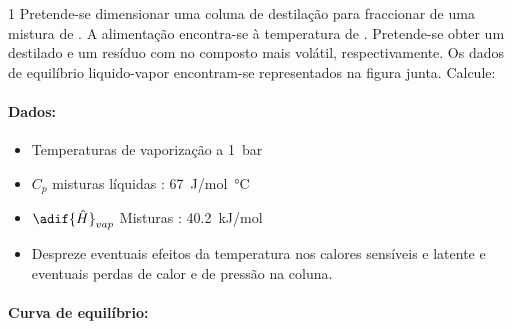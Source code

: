 \documentclass[\mainfilename]{subfiles}
\begin{document}
\begin{questionBox}1{ %
    Pretende-se dimensionar uma coluna de destilação para fraccionar  de uma mistura de . A alimentação encontra-se à temperatura de . Pretende-se obter um destilado e um resíduo com  no composto mais volátil, respectivamente. Os dados de equilíbrio liquido-vapor encontram-se representados na figura junta. Calcule:
} %
    \paragraph*{Dados:}
    \begin{itemize}
        \item Temperaturas de vaporização a \qty*{1}{\bar}
        \begin{itemize}\vspace{-2ex}
        \end{itemize}
        \item \(C_p\) misturas líquidas : \qty*{67}{\joule/\mole.\celsius}
        \item \(\adif{\hat{H}}_{vap}\) Misturas : \qty*{40.2}{\kilo\joule/\mole}
        \item Despreze eventuais efeitos da temperatura nos calores sensíveis e latente e eventuais perdas de calor e de pressão na coluna.
    \end{itemize}
    \paragraph*{Curva de equilíbrio:}
    \begin{center}
        \vspace{1ex}
        \begin{tabular}{L *{6}{C}}
            \toprule
            

\end{tabular}
\end{center}
\end{questionBox}
\end{document}
